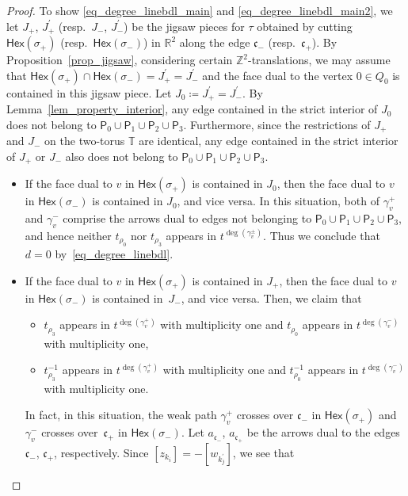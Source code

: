 \documentclass[10pt,a4paper]{amsart}
\numberwithin{equation}{section}
\theoremstyle{definition}
\newcommand{\ZZ}{\mathbb{Z}}
\newcommand{\RR}{\mathbb{R}}
\newcommand{\TT}{\mathbb{T}}
\newcommand{\fkc}{\mathfrak{c}}
\newcommand{\sfP}{\mathsf{P}}
\newcommand{\Hex}{\mathsf{Hex}}
\begin{document}
\begin{proof}
To show \eqref{eq_degree_linebdl_main} and \eqref{eq_degree_linebdl_main2},
we let $J_+$, $J_+^\prime$ (resp.\ $J_-$, $J_-^\prime$) be the jigsaw pieces for $\tau$ obtained by cutting
$\Hex(\sigma_+)$ (resp.\ $\Hex(\sigma_-)$) in $\RR^2$ along the edge $\fkc_-$ (resp.\ $\fkc_+$).
By Proposition~\ref{prop_jigsaw}, considering certain $\ZZ^2$-translations, we may assume that
$\Hex(\sigma_+)\cap \Hex(\sigma_-)=J_+^\prime=J_-^\prime$ and the face dual to the vertex $0\in Q_0$ is contained in this jigsaw piece.
Let $J_0\coloneqq J_+^\prime=J_-^\prime$.
By Lemma~\ref{lem_property_interior}, any edge contained in the strict interior of $J_0$ does not belong to $\sfP_0\cup \sfP_1\cup \sfP_2\cup \sfP_3$.
Furthermore, since the restrictions of $J_+$ and $J_-$ on the two-torus $\TT$ are identical,
any edge contained in the strict interior of $J_+$ or $J_-$ also does not belong to $\sfP_0\cup \sfP_1\cup \sfP_2\cup \sfP_3$.
\begin{itemize}\itemsep=0pt
\item If the face dual to $v$ in $\Hex(\sigma_+)$ is contained in $J_0$, then the face dual to $v$ in $\Hex(\sigma_-)$ is contained in $J_0$,
and vice versa.
In this situation, both of $\gamma_v^+$ and $\gamma_v^-$ comprise the arrows dual to edges not belonging to $\sfP_0\cup \sfP_1\cup \sfP_2\cup \sfP_3$,
and hence neither $t_{\rho_0}$ nor $t_{\rho_3}$ appears in $t^{\deg(\gamma_v^\pm)}$.
Thus we conclude that $d=0$ by~\eqref{eq_degree_linebdl}.
\item If the face dual to $v$ in $\Hex(\sigma_+)$ is contained in $J_+$, then the face dual to $v$ in $\Hex(\sigma_-)$ is contained in~$J_-$,
and vice versa. Then, we claim that
\begin{itemize}\setlength{\leftskip}{1cm}\itemsep=0pt
\item[(Case 1)] $t_{\rho_3}$ appears in $t^{\deg(\gamma^+_v)}$ with multiplicity one and $t_{\rho_0}$ appears in $t^{\deg(\gamma^-_v)}$ with multiplicity one,
\item[(Case 2)] $t_{\rho_3}^{-1}$ appears in $t^{\deg(\gamma^+_v)}$ with multiplicity one and $t_{\rho_0}^{-1}$ appears in $t^{\deg(\gamma^-_v)}$ with multiplicity one.
\end{itemize}
In fact, in this situation, the weak path $\gamma_v^+$ crosses over $\fkc_-$ in $\Hex(\sigma_+)$ and $\gamma_v^-$ crosses over~$\fkc_+$ in $\Hex(\sigma_-)$.
Let $a_{\fkc_-}$, $a_{\fkc_+}$ be the arrows dual to the edges $\fkc_-$, $\fkc_+$, respectively.
Since $[z_{k_i}]=-[w_{k^\prime_j}]$, we see that

\end{itemize}
\end{proof}
\end{document}
